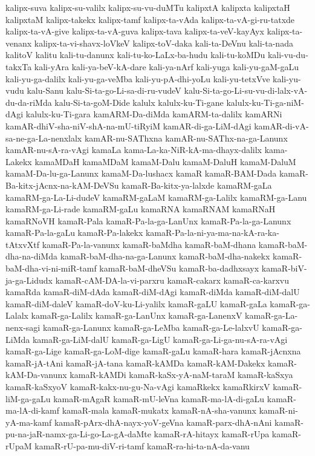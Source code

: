 {kalipx-suva
kalipx-su-valilx
kalipx-su-vu-duMTu
kalipxtA
kalipxta
kalipxtaH
kalipxtaM
kalipx-takekx
kalipx-tamf
kalipx-ta-vAda
kalipx-ta-vA-gi-ru-tatxde
kalipx-ta-vA-give
kalipx-ta-vA-guva
kalipx-tava
kalipx-ta-veV-kayAyx
kalipx-ta-venanx
kalipx-ta-vi-shavx-loVkeV
kalipx-toV-daka
kali-ta-DeVnu
kali-ta-nada
kalitoV
kalitu
kali-tu-danunx
kali-tu-ko-LaLx-ba-hudu
kali-tu-koMDu
kali-vu-du-takxTa
kali-yAra
kali-ya-beV-kA-dare
kali-ya-nArf
kali-yuga
kali-yu-gaM-gaLu
kali-yu-ga-dalilx
kali-yu-ga-veMba
kali-yu-pA-dhi-yoLu
kali-yu-tetxVve
kali-yu-vudu
kalu-Sanu
kalu-Si-ta-go-Li-sa-di-ru-vudeV
kalu-Si-ta-go-Li-su-vu-di-lalx-vA-du-da-riMda
kalu-Si-ta-goM-Dide
kalulx
kalulx-ku-Ti-gane
kalulx-ku-Ti-ga-niM-dAgi
kalulx-ku-Ti-gara
kamARM-Da-diMda
kamARM-ta-dalilx
kamARNi
kamAR-dhiV-sha-niV-shA-na-mU-tiRyiM
kamAR-di-ga-LiM-dAgi
kamAR-di-vA-sa-ne-ga-La-nenxlalx
kamAR-nu-SAThxna
kamAR-nu-SAThx-na-ga-Lanunx
kamAR-nu-sA-ra-vAgi
kamaLa
kama-La-ka-NiR-kA-ma-dhayx-dalilx
kama-Lakekx
kamaMDaH
kamaMDaM
kamaM-Dalu
kamaM-DaluH
kamaM-DaluM
kamaM-Da-lu-ga-Lanunx
kamaM-Da-lushacx
kamaR
kamaR-BAM-Dada
kamaR-Ba-kitx-jAcnx-na-kAM-DeVSu
kamaR-Ba-kitx-ya-lalxde
kamaRM-gaLa
kamaRM-ga-La-Li-dudeV
kamaRM-gaLaM
kamaRM-ga-Lalilx
kamaRM-ga-Lanu
kamaRM-ga-Li-rade
kamaRM-gaLu
kamaRNA
kamaRNAM
kamaRNaH
kamaRNoVH
kamaR-Pala
kamaR-Pa-la-ga-LanUnx
kamaR-Pa-la-ga-Lanunx
kamaR-Pa-la-gaLu
kamaR-Pa-lakekx
kamaR-Pa-la-ni-ya-ma-na-kA-ra-ka-tAtxvXtf
kamaR-Pa-la-vanunx
kamaR-baMdha
kamaR-baM-dhana
kamaR-baM-dha-na-diMda
kamaR-baM-dha-na-ga-Lanunx
kamaR-baM-dha-nakekx
kamaR-baM-dha-vi-ni-miR-tamf
kamaR-baM-dheVSu
kamaR-ba-dadhxsayx
kamaR-biV-ja-ga-Lidudx
kamaR-cAM-DA-la-vi-parxru
kamaR-cakarx
kamaR-ca-karxvu
kamaRda
kamaR-diM-dAda
kamaR-diM-dAgi
kamaR-diMda
kamaR-diM-dalU
kamaR-diM-daleV
kamaR-doV-ku-Li-yalilx
kamaR-gaLU
kamaR-gaLa
kamaR-ga-Lalalx
kamaR-ga-Lalilx
kamaR-ga-LanUnx
kamaR-ga-LanenxV
kamaR-ga-La-nenx-sagi
kamaR-ga-Lanunx
kamaR-ga-LeMba
kamaR-ga-Le-lalxvU
kamaR-ga-LiMda
kamaR-ga-LiM-dalU
kamaR-ga-LigU
kamaR-ga-Li-ga-nu-sA-ra-vAgi
kamaR-ga-Lige
kamaR-ga-LoM-dige
kamaR-gaLu
kamaR-hara
kamaR-jAcnxna
kamaR-jA-tAni
kamaR-jA-tana
kamaR-kAMDa
kamaR-kAM-Dakekx
kamaR-kAM-Da-vanunx
kamaR-kAMDi
kamaR-kaSx-yA-naM-taraM
kamaR-kaSxya
kamaR-kaSxyoV
kamaR-kakx-nu-gu-Na-vAgi
kamaRkekx
kamaRkirxV
kamaR-liM-ga-gaLu
kamaR-mAgaR
kamaR-mU-leVna
kamaR-ma-lA-di-gaLu
kamaR-ma-lA-di-kamf
kamaR-mala
kamaR-mukatx
kamaR-nA-sha-vanunx
kamaR-ni-yA-ma-kamf
kamaR-pArx-dhA-nayx-yoV-geVna
kamaR-parx-dhA-nAni
kamaR-pu-na-jaR-namx-ga-Li-go-La-gA-daMte
kamaR-rA-hitayx
kamaR-rUpa
kamaR-rUpaM
kamaR-rU-pa-mu-diV-ri-tamf
kamaR-ra-hi-ta-nA-da-vanu
}
